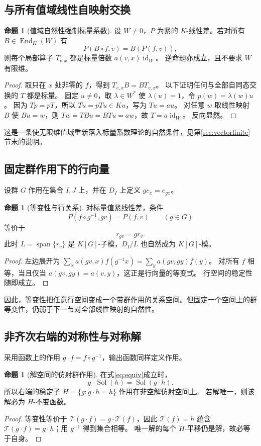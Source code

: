 \documentclass[UTF8,11pt,a4paper]{ctexart}
\theoremstyle{definition}
\newtheorem{proposition}[theorem]{命题}
\newcommand{\End}{\operatorname{End}}
\newcommand{\Span}{\operatorname{span}}
\newcommand{\id}{\operatorname{id}}
\newcommand{\T}{\mathcal T}
\newcommand{\Sol}{\operatorname{Sol}}
\numberwithin{equation}{section}
\begin{document}
\subsection{与所有值域线性自映射交换}
\begin{proposition}[值域自然性强制标量系数]\label{prop:commutant}
设 $W\ne0$，$P$ 为紧的 $K$-线性差。若对所有 $B\in\End_K(W)$ 有
\[
 P(B\circ f,v)=B(P(f,v)),
\]
则每个局部算子 $T_{v,x}$ 都是标量倍数 $a(v,x)\id_W$。
逆命题亦成立，且不要求 $W$ 有限维。
\end{proposition}
\begin{proof}
取只在 $x$ 处非零的 $f$，得到 $T_{v,x}B=BT_{v,x}$。
以下证明任何与全部自同态交换的 $T$ 都是标量。
固定 $u\ne0$，取 $\lambda\in W^*$ 使 $\lambda(u)=1$，令 $p(w)=\lambda(w)u$。
因为 $Tp=pT$，所以 $Tu=pTu\in Ku$，写为 $Tu=au$。
对任意 $w$ 取线性映射 $B$ 使 $Bu=w$，则 $Tw=TBu=BTu=aw$，故 $T=a\id_W$。
反向显然。
\end{proof}
这是一条使无限维值域重新落入标量系数理论的自然条件，见第\ref{sec:vectorfinite}节末的说明。

\subsection{固定群作用下的行向量}
设群 $G$ 作用在集合 $I,J$ 上，并在 $D_I$ 上定义 $g e_x=e_{gx}$。
\begin{proposition}[等变性与行关系]
对标量值紧线性差，条件
\begin{equation}\label{eq:equiv}
 P(f\circ g^{-1},gv)=P(f,v)\qquad(g\in G)
\end{equation}
等价于
\[
 r_{gv}=g r_v.
\]
此时 $L=\Span\{r_v\}$ 是 $K[G]$-子模，$D_I/L$ 也自然成为 $K[G]$-模。
\end{proposition}
\begin{proof}
左边展开为 $\sum_xa(gv,x)f(g^{-1}x)=\sum_ya(gv,gy)f(y)$。
对所有 $f$ 相等，当且仅当 $a(gv,gy)=a(v,y)$，这正是行向量的等变式。
行空间的稳定性随即成立。
\end{proof}
因此，等变性把任意行空间变成一个带群作用的关系空间。但固定一个空间上的群等变性，仍弱于下一节对全部线性映射的自然性。

\subsection{非齐次右端的对称性与对称解}
采用函数上的作用 $g\cdot f=f\circ g^{-1}$，输出函数同样定义作用。
\begin{proposition}[解空间的仿射群作用]\label{prop:affinesolutions}
在式\eqref{eq:equiv}成立时，
\[
 g\cdot\Sol(h)=\Sol(g\cdot h).
\]
所以右端的稳定子 $H=\{g:g\cdot h=h\}$ 作用在非空解仿射空间上。
若解唯一，则该解必为 $H$-不变函数。
\end{proposition}
\begin{proof}
等变性等价于 $\T(g\cdot f)=g\cdot\T(f)$，因此 $\T(f)=h$ 蕴含 $\T(g\cdot f)=g\cdot h$；用 $g^{-1}$ 得到集合相等。
唯一解的每个 $H$-平移仍是解，故必等于自身。
\end{proof}
\end{document}
